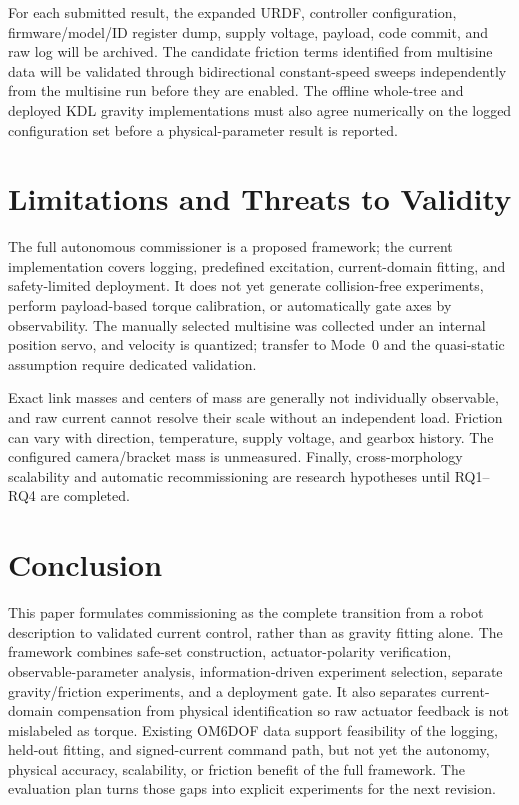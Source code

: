 \documentclass[conference]{IEEEtran}
\begin{document}
For each submitted result, the expanded URDF, controller configuration,
firmware/model/ID register dump, supply voltage, payload, code commit, and raw
log will be archived. The candidate friction terms identified from multisine
data will be validated through bidirectional constant-speed sweeps independently
from the multisine run before they are enabled. The offline whole-tree and
deployed KDL gravity implementations must also agree numerically on the logged
configuration set before a physical-parameter result is reported.

\section{Limitations and Threats to Validity}
The full autonomous commissioner is a proposed framework; the current
implementation covers logging, predefined excitation, current-domain fitting,
and safety-limited deployment. It does not yet generate collision-free
experiments, perform payload-based torque calibration, or automatically gate
axes by observability. The manually selected multisine was collected under an
internal position servo, and velocity is quantized; transfer to Mode~0 and the
quasi-static assumption require dedicated validation.

Exact link masses and centers of mass are generally not individually
observable, and raw current cannot resolve their scale without an independent
load. Friction can vary with direction, temperature, supply voltage, and
gearbox history. The configured camera/bracket mass is unmeasured. Finally,
cross-morphology scalability and automatic recommissioning are research
hypotheses until RQ1--RQ4 are completed.

\section{Conclusion}
This paper formulates commissioning as the complete transition from a robot
description to validated current control, rather than as gravity fitting alone.
The framework combines safe-set construction, actuator-polarity verification,
observable-parameter analysis, information-driven experiment selection,
separate gravity/friction experiments, and a deployment gate. It also separates
current-domain compensation from physical identification so raw actuator
feedback is not mislabeled as torque. Existing OM6DOF data support feasibility
of the logging, held-out fitting, and signed-current command path, but not yet
the autonomy, physical accuracy, scalability, or friction benefit of the full
framework. The evaluation plan turns those gaps into explicit experiments for
the next revision.



\end{document}
